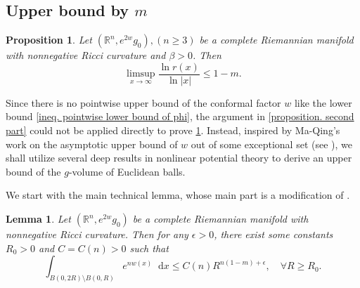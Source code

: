 \documentclass[10pt,a4paper]{amsart}
\newtheorem{proposition}[theorem]{Proposition}
\newtheorem{lemma}[theorem]{Lemma}
\numberwithin{equation}{section}
\newcommand{\dx}{\mathop{}\!\mathrm{d}x}
\begin{document}
\subsection{Upper bound by $m$ }
\begin{proposition}\label{proposition. third part}
    Let $(\mathbb{R}^n,e^{2w}g_0), (n\geq 3)$ be a complete Riemannian manifold with nonnegative Ricci curvature and $\beta>0$.
    Then 
    \[
        \limsup_{x\to \infty}\frac{\ln r(x)}{\ln |x|}\leq 1-m.
    \]
\end{proposition}

Since there is no pointwise upper bound of the conformal factor $w$ like the lower bound \cref{ineq. pointwise lower bound of phi}, the argument in \cref{proposition. second part} could not be applied directly to  prove \cref{proposition. third part}.
Instead, inspired by Ma-Qing's work on the asymptotic upper bound of $w$ out of some exceptional set (see \cite[Theorem 3.1]{MQ}), we shall utilize several deep results in nonlinear potential theory to derive an upper bound of the $g$-volume of Euclidean balls.

We start with the main technical lemma, whose main part is a modification of \cite[proposition 4.1]{MQ}.

\begin{lemma}\label{lemma. integral of exp(n phi)}
    Let $(\mathbb{R}^n,e^{2w}g_0)$ be a complete Riemannian manifold with nonnegative Ricci curvature.
    Then for any $\epsilon>0$, there exist some constants $R_0>0$ and $C=C(n)>0$ such that
    \[
        \int_{B(0,2R)\setminus B(0,R)} e^{nw(x)}\dx 
        \leq C(n)R^{n(1-m)+\epsilon},\quad \forall R\geq R_0.
    \]
\end{lemma}
\end{document}
